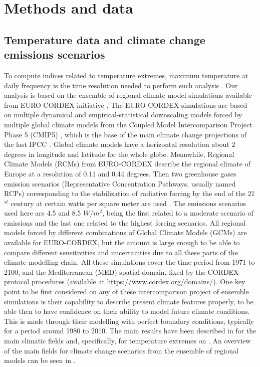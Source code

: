 \section{Methods and data}

\subsection{Temperature data and climate change emissions scenarios}

To compute indices related to temperature extremes, maximum temperature at daily frequency is the
time resolution needed to perform such analysis \cite{per2015}.
Our analysis is based on the ensemble of regional climate model simulations available
from EURO-CORDEX initiative \cite{jac_al2014,kot_al2014}. The EURO-CORDEX simulations 
are based on multiple dynamical and empirical-statistical downscaling models forced 
by multiple global climate models from the Coupled Model Intercomparison 
Project Phase 5 (CMIP5) \cite{tay_al2012}, which is the base of the
main climate change projections of the last IPCC \cite{sto2014}.
Global climate models have a horizontal resolution about
2 degrees in longitude and latitude for the whole globe. Meanwhile, Regional Climate
Models (RCMs) from EURO-CORDEX describe the regional climate of Europe at a resolution
of 0.11 and 0.44 degrees.
Then two greenhouse gases emission scenarios (Representative Concentration Pathways, 
usually named RCPs) corresponding to the stabilization of 
radiative forcing by the end of the 21$^{st}$ century at certain watts per
square meter are used \cite{mos_al2010}. The emissions scenarios used here are 4.5 and 8.5 $W/m^2$,
being the first related to a moderate scenario of emissions and the last one related
to the highest forcing scenarios.
All regional models forced by different combinations of Global Climate
Models (GCMs) are available for
EURO-CORDEX, but the amount is large enough to be able to compare different
sensitivities and uncertainties due to all these parts of the climate modelling chain.
All these simulations cover the time period from 1971 to 2100, and the Mediterranean (MED) spatial
domain, fixed by the CORDEX protocol procedures (available at https://www.cordex.org/domains/).
One key point to be first considered on any of these intercomparison
project of ensemble simulations is their capability 
to describe present climate features properly, to be able then to
have confidence on their ability to model future climate conditions. This is made through their modelling
with perfect boundary conditions, typically for
a period around 1980 to 2010. The main 
results have been described in \cite{kot_al2014} for the
main climatic fields and, specifically, for temperature extremes on \cite{vau_al2013}.
An overview of the main fields for climate change
scenarios from the ensemble of regional models can be seen in \cite{jac_al2014}.

